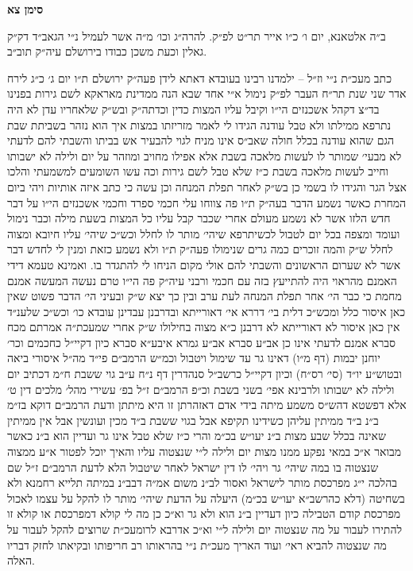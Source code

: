 \documentclass[12pt, openany]{book}
\newcommand{\chapname}{}
\newcommand{\newchap}[1]{
	\addcontentsline{toc}{chapter}{#1}
	\renewcommand{\chapname}{#1}
		\begin{center}
			\textbf{%
\fontsize{16pt}{16pt}\selectfont
				#1}
		\end{center}
}
\begin{document}
\newchap{סימן צא}
\begin{multicols}{2}
ב״ה אלטאנא, יום ו׳ כ״ו אייר תר״ט לפ״ק. להרה״ג וכו׳ מ״ה אשר לעמיל נ״י הגאב״ד דק״ק גאלין וכעת משכן כבודו בירושלם עיה״ק תוב״ב.\\\vspace{0pt}

כתב מעכ״ת נ״י וז״ל – ילמדנו רבינו בעובדא דאתא לידן פעה״ק ירושלם ת״ו יום ג׳ כ״ג לירח אדר שני שנת תר״ח העבר לפ״ק נימול א״י אחד שבא הנה ממדינת מאראקא לשם גירות בפנינו בד״צ דקהל אשכנזים הי״ו וקיבל עליו המצות כדין וכדתה״ק ובש״ק שלאחריו עדן לא היה נתרפא ממילתו ולא טבל עודנה הגידו לי לאמר מזריזתו במצות איך הוא נזהר בשביתת שבת הגם שהוא עודנה בכלל חולה שאב״ס אינו מניח לגוי להבעיר אש בביתו והשבתי להם לדעתי לא מבעי׳ שמותר לו לעשות מלאכה בשבת אלא אפילו מחויב ומוזהר על יום ולילה לא ישבותו וחייב לעשות מלאכה בשבת כ״ז שלא טבל לשם גירות וכה עשו השומעים למשמעתי והלכו אצל הגר והגידו לו בשמי כן בש״ק לאחר תפלת המנחה וכן עשה כי כתב איזה אותיות ויהי ביום המחרת כאשר נשמע הדבר בעה״ק ת״ו פה צווחו עלי חכמי ספרד וחכמי אשכנזים הי״ו על דבר חדש הלזו אשר לא נשמע מעולם אחרי שכבר קבל עליו כל המצות בשעת מילה וכבר נימול ועומד ומצפה בכל יום לטבול לכשיתרפא שיהי׳ מותר לו לחלל וכש״כ שיהי׳ עליו חיובא ומצוה לחלל ש״ק והמה זוכרים כמה גרים שנימולו פעה״ק ת״ו ולא נשמע כזאת ומנין לי לחדש דבר אשר לא שערום הראשונים והשבתי להם אולי מקום הניחו לי להתגדר בו. ואמינא טעמא דידי האמנם מהראוי היה להתייעץ בזה עם חכמי ורבני עיה״ק פה הי״ו טרם נעשה המעשה אמנם מחמת כי כבר הי׳ אחר תפלת המנחה לעת ערב ובין כך יצא ש״ק ובעיני הי׳ הדבר פשוט שאין כאן איסור כלל ומכש״כ דלית בי׳ דררא אי׳ דאורייתא ובדרבנן עבדינן עובדא כו׳ וכש״כ שלענ״ד אין כאן איסור לא דאורייתא לא דרבנן כ״א מצוה בחילולו ש״ק אחרי שמעכת״ה אמרתם מכח סברא אמנם לדעתי אינו כן אב״ע סברא אב״ע גמרא איבע״א סברא כיון דקיי״ל כחכמים וכר׳ יוחנן יבמות (דף מ״ו) דאינו גר עד שימול ויטבול וכמ״ש הרמב״ם פי״ד מה״ל איסורי ביאה ובטוש״ע יו״ד (סי׳ רס״ח) וכיון דקיי״ל כרשב״ל סנהדרין דף נ״ח ע״ב גוי ששבת ח״מ דכתיב יום ולילה לא ישבותו ולרבינא אפי׳ בשני בשבת וכ״פ הרמב״ם ז״ל בפ׳ עשירי מהל׳ מלכים דין ט׳ אלא דפשטא דהש״ס משמע מיתה בידי אדם דאזהרתן זו היא מיתתן ודעת הרמב״ם דוקא בז״מ ב״נ ב״ד ממיתין עליהן כשידינו תקיפא אבל בגוי ששבת ב״ד מכין ועונשין אבל אין ממיתין שאינה בכלל שבע מצות ב״נ יעו״ש בכ״מ והרי כ״ז שלא טבל אינו גר ועדיין הוא ב״נ כאשר מבואר א״כ במאי נפקע ממנו מצות יום ולילה ל״י שנצטוה עליו והאיך יוכל לפטור א״ע ממצוה שנצטוה בו במה שיהי׳ גר ויהי׳ לו דין ישראל לאחר שיטבול הלא לדעת הרמב״ם ז״ל שם בהלכה י״ג מפרכסת מותר לישראל ואסור לב״נ משום אמ״ה דבב״נ במיתה תלייא רחמנא ולא בשחיטה (דלא כהרשב״א יעו״ש בכ״מ) היעלה על הדעת שיהי׳ מותר לו להקל על עצמו לאכול מפרכסת קודם הטבילה כיון דעדיין ב״נ הוא ולא גר וא״כ כן מה לי קולא דמפרכסת או קולא זו להתירו לעבור על מה שנצטוה יום ולילה ל״י וא״כ אדרבא לרומעכ״ת שרוצים להקל לעבור על מה שנצטוה להביא ראי׳ ועוד האריך מעכ״ת נ״י בהראותו רב חריפותו ובקיאתו לחזק דבריו האלה.\\\vspace{0pt}


\end{multicols}
\end{document}
